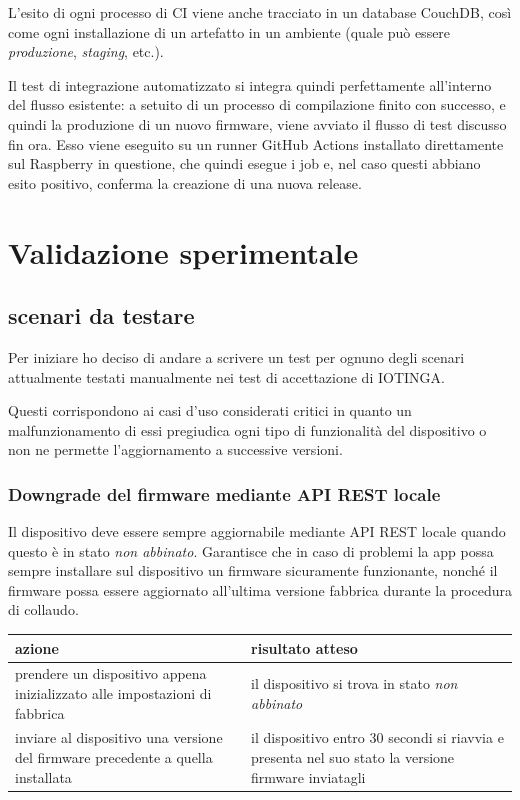 \documentclass[12pt,a4paper,twoside,titlepage]{book}
\begin{document}
L'esito di ogni processo di CI viene anche tracciato in un database CouchDB,
così come ogni installazione di un artefatto in un ambiente (quale può essere
\textit{produzione}, \textit{staging}, etc.).

Il test di integrazione automatizzato si integra quindi perfettamente all'interno
del flusso esistente: a setuito di un processo di compilazione finito con successo,
e quindi la produzione di un nuovo firmware, viene avviato il flusso di test discusso
fin ora. Esso viene eseguito su un runner GitHub Actions installato direttamente
sul Raspberry in questione, che quindi esegue i job e, nel caso questi abbiano
esito positivo, conferma la creazione di una nuova release.

\chapter{Validazione sperimentale}

\section{scenari da testare}

Per iniziare ho deciso di andare a scrivere un test per ognuno degli scenari attualmente
testati manualmente nei test di accettazione di IOTINGA.

Questi corrispondono ai casi d'uso considerati critici in quanto un malfunzionamento
di essi pregiudica ogni tipo di funzionalità del dispositivo o non ne permette l'aggiornamento
a successive versioni.

\subsection{Downgrade del firmware mediante API REST locale}
Il dispositivo deve essere sempre aggiornabile mediante API REST locale quando questo
è in stato \textit{non abbinato}. Garantisce che in caso di problemi la app possa sempre
installare sul dispositivo un firmware sicuramente funzionante, nonché il firmware
possa essere aggiornato all’ultima versione fabbrica durante la procedura di collaudo.

\begin{center}
\begin{tabular}{| p{5cm} | p{5cm} |}
    \hline \textbf{azione} & \textbf{risultato atteso} \\
    \hline prendere un dispositivo appena inizializzato alle impostazioni di fabbrica & il dispositivo si trova in stato \textit{non abbinato} \\
    \hline inviare al dispositivo una versione del firmware precedente a quella installata & il dispositivo entro 30 secondi si riavvia e presenta nel suo stato la versione firmware inviatagli \\
    \hline
\end{tabular}
\end{center}
\end{document}
